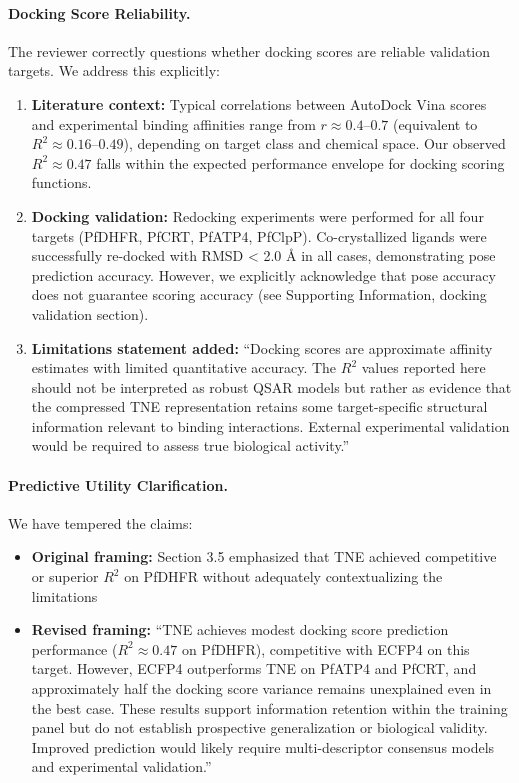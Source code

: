\documentclass[11pt]{article}
\begin{document}
\paragraph{Docking Score Reliability.}
The reviewer correctly questions whether docking scores are reliable validation targets. 
We address this explicitly:
\begin{enumerate}[label=\alph*),leftmargin=1.6em]
\item \textbf{Literature context:} Typical correlations between AutoDock Vina scores and 
experimental binding affinities range from $r \approx 0.4$--$0.7$ (equivalent to 
$R^2 \approx 0.16$--$0.49$), depending on target class and chemical space. Our observed 
$R^2 \approx 0.47$ falls within the expected performance envelope for docking scoring functions.

\item \textbf{Docking validation:} Redocking experiments were performed for all four targets 
(PfDHFR, PfCRT, PfATP4, PfClpP). Co-crystallized ligands were successfully re-docked with 
RMSD < 2.0 Å in all cases, demonstrating pose prediction accuracy. However, we explicitly 
acknowledge that pose accuracy does not guarantee scoring accuracy (see Supporting Information, 
docking validation section).

\item \textbf{Limitations statement added:} ``Docking scores are approximate affinity estimates 
with limited quantitative accuracy. The $R^2$ values reported here should not be interpreted 
as robust QSAR models but rather as evidence that the compressed TNE representation retains 
some target-specific structural information relevant to binding interactions. External 
experimental validation would be required to assess true biological activity.''
\end{enumerate}

\paragraph{Predictive Utility Clarification.}
We have tempered the claims:
\begin{itemize}[leftmargin=1.6em]
\item \textbf{Original framing:} Section 3.5 emphasized that TNE achieved competitive or 
superior $R^2$ on PfDHFR without adequately contextualizing the limitations
\item \textbf{Revised framing:} ``TNE achieves modest docking score prediction performance 
($R^2 \approx 0.47$ on PfDHFR), competitive with ECFP4 on this target. However, ECFP4 
outperforms TNE on PfATP4 and PfCRT, and approximately half the docking score variance remains 
unexplained even in the best case. These results support information retention within the 
training panel but do not establish prospective generalization or biological validity. 
Improved prediction would likely require multi-descriptor consensus models and experimental 
validation.''
\end{itemize}
\end{document}
